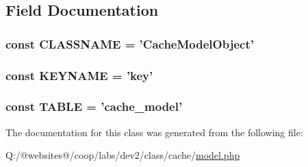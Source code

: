 \subsection{Field Documentation}
\hypertarget{class_cache_model_handler_af8eef153e1171aa600855d5dff3cb3b7}{
\subsubsection[{C\-L\-A\-S\-S\-N\-A\-M\-E}]{\setlength{\rightskip}{0pt plus 5cm}const C\-L\-A\-S\-S\-N\-A\-M\-E = '{\bf Cache\-Model\-Object}'}}\label{class_cache_model_handler_af8eef153e1171aa600855d5dff3cb3b7}
\hypertarget{class_cache_model_handler_aadb8b621c723279823aea9639ceee67e}{
\subsubsection[{K\-E\-Y\-N\-A\-M\-E}]{\setlength{\rightskip}{0pt plus 5cm}const K\-E\-Y\-N\-A\-M\-E = 'key'}}\label{class_cache_model_handler_aadb8b621c723279823aea9639ceee67e}
\hypertarget{class_cache_model_handler_adf62e2b172196282218b1ece3d200fa1}{
\subsubsection[{T\-A\-B\-L\-E}]{\setlength{\rightskip}{0pt plus 5cm}const T\-A\-B\-L\-E = 'cache\-\_\-model'}}\label{class_cache_model_handler_adf62e2b172196282218b1ece3d200fa1}


The documentation for this class was generated from the following file\-:\begin{DoxyCompactItemize}
\item 
Q\-:/@websites@/coop/labs/dev2/class/cache/\hyperlink{model_8php}{model.\-php}\end{DoxyCompactItemize}
